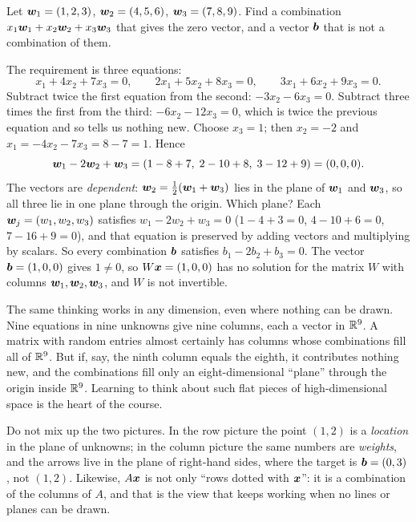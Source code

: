 \begin{example}\label{ex:u01-plane}
Let $\boldsymbol{w}_1=(1,2,3)$, $\boldsymbol{w}_2=(4,5,6)$, $\boldsymbol{w}_3=(7,8,9)$. Find a combination
$x_1\boldsymbol{w}_1+x_2\boldsymbol{w}_2+x_3\boldsymbol{w}_3$ that gives the zero vector, and a vector $\boldsymbol{b}$ that
is not a combination of them.

The requirement is three equations:
\[
  x_1+4x_2+7x_3=0,\qquad 2x_1+5x_2+8x_3=0,\qquad 3x_1+6x_2+9x_3=0 .
\]
Subtract twice the first equation from the second: $-3x_2-6x_3=0$. Subtract three times
the first from the third: $-6x_2-12x_3=0$, which is twice the previous equation and so
tells us nothing new. Choose $x_3=1$; then $x_2=-2$ and $x_1=-4x_2-7x_3=8-7=1$. Hence
\[
  \boldsymbol{w}_1 - 2\boldsymbol{w}_2 + \boldsymbol{w}_3 = (1-8+7,\; 2-10+8,\; 3-12+9) = (0,0,0).
\]
The vectors are \emph{dependent}: $\boldsymbol{w}_2=\tfrac12(\boldsymbol{w}_1+\boldsymbol{w}_3)$ lies in the plane
of $\boldsymbol{w}_1$ and $\boldsymbol{w}_3$, so all three lie in one plane through the origin. Which plane?
Each $\boldsymbol{w}_j=(w_1,w_2,w_3)$ satisfies $w_1-2w_2+w_3=0$ ($1-4+3=0$, $4-10+6=0$,
$7-16+9=0$), and that equation is preserved by adding vectors and multiplying by scalars. So
every combination $\boldsymbol{b}$ satisfies $b_1-2b_2+b_3=0$. The vector $\boldsymbol{b}=(1,0,0)$ gives
$1\neq0$, so $W\boldsymbol{x}=(1,0,0)$ has no solution for the matrix $W$ with columns
$\boldsymbol{w}_1,\boldsymbol{w}_2,\boldsymbol{w}_3$, and $W$ is not invertible.
\end{example}

The same thinking works in any dimension, even where nothing can be drawn. Nine equations
in nine unknowns give nine columns, each a vector in $\mathbb{R}^9$. A matrix with random entries
almost certainly has columns whose combinations fill all of $\mathbb{R}^9$. But if, say, the ninth
column equals the eighth, it contributes nothing new, and the combinations fill only an
eight-dimensional ``plane'' through the origin inside $\mathbb{R}^9$. Learning to think about such
flat pieces of high-dimensional space is the heart of the course.

\begin{trap}
Do not mix up the two pictures. In the row picture the point $(1,2)$ is a \emph{location}
in the plane of unknowns; in the column picture the same numbers are \emph{weights}, and the
arrows live in the plane of right-hand sides, where the target is $\boldsymbol{b}=(0,3)$, not
$(1,2)$. Likewise, $A\boldsymbol{x}$ is not only ``rows dotted with $\boldsymbol{x}$'': it is a combination
of the columns of $A$, and that is the view that keeps working when no lines or planes can
be drawn.
\end{trap}

